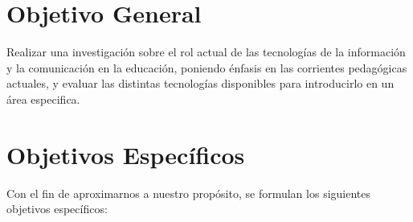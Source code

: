 \section{Objetivo General}
\label{sec:objetivos_generales}

Realizar una investigación sobre el rol actual de las tecnologías de la
información y la comunicación en la educación, poniendo énfasis en las 
corrientes pedagógicas actuales, y evaluar las distintas tecnologías 
disponibles para introducirlo en un área especifica.






\section{Objetivos Específicos}

Con el fin de aproximarnos a nuestro propósito, se formulan los siguientes
objetivos específicos:

